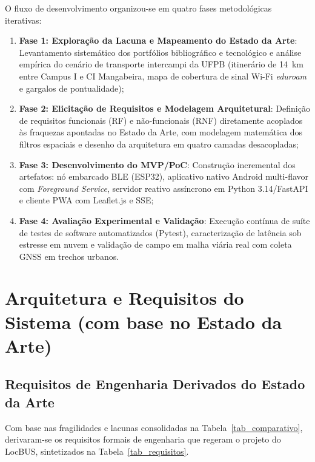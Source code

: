 \documentclass[lettersize,journal]{IEEEtran}
\begin{document}
O fluxo de desenvolvimento organizou-se em quatro fases metodológicas iterativas:
\begin{enumerate}
    \item \textbf{Fase 1: Exploração da Lacuna e Mapeamento do Estado da Arte}: Levantamento sistemático dos portfólios bibliográfico e tecnológico e análise empírica do cenário de transporte intercampi da UFPB (itinerário de 14~km entre Campus I e CI Mangabeira, mapa de cobertura de sinal Wi-Fi \textit{eduroam} e gargalos de pontualidade);
    \item \textbf{Fase 2: Elicitação de Requisitos e Modelagem Arquitetural}: Definição de requisitos funcionais (RF) e não-funcionais (RNF) diretamente acoplados às fraquezas apontadas no Estado da Arte, com modelagem matemática dos filtros espaciais e desenho da arquitetura em quatro camadas desacopladas;
    \item \textbf{Fase 3: Desenvolvimento do MVP/PoC}: Construção incremental dos artefatos: nó embarcado BLE (ESP32), aplicativo nativo Android multi-flavor com \textit{Foreground Service}, servidor reativo assíncrono em Python 3.14/FastAPI e cliente PWA com Leaflet.js e SSE;
    \item \textbf{Fase 4: Avaliação Experimental e Validação}: Execução contínua de suíte de testes de software automatizados (Pytest), caracterização de latência sob estresse em nuvem e validação de campo em malha viária real com coleta GNSS em trechos urbanos.
\end{enumerate}

\section{Arquitetura e Requisitos do Sistema (com base no Estado da Arte)}

\subsection{Requisitos de Engenharia Derivados do Estado da Arte}
Com base nas fragilidades e lacunas consolidadas na Tabela~\ref{tab_comparativo}, derivaram-se os requisitos formais de engenharia que regeram o projeto do LocBUS, sintetizados na Tabela~\ref{tab_requisitos}.
\end{document}
